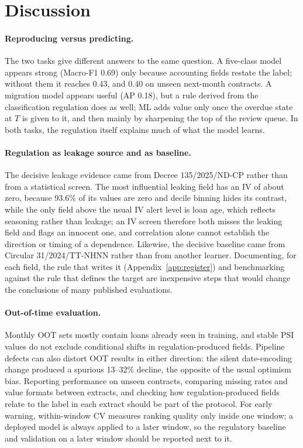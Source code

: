 \documentclass[runningheads]{llncs}
\begin{document}
\section{Discussion}
\label{sec:discussion}

\paragraph{Reproducing versus predicting.} The two tasks give different answers to the same question. A five-class model appears strong (Macro-F1 0.69) only because accounting fields restate the label; without them it reaches 0.43, and 0.40 on unseen next-month contracts. A migration model appears useful (AP 0.18), but a rule derived from the classification regulation does as well; ML adds value only once the overdue state at $T$ is given to it, and then mainly by sharpening the top of the review queue. In both tasks, the regulation itself explains much of what the model learns.

\paragraph{Regulation as leakage source and as baseline.} The decisive leakage evidence came from Decree 135/2025/ND-CP rather than from a statistical screen. The most influential leaking field has an IV of about zero, because 93.6\% of its values are zero and decile binning hides its contrast, while the only field above the usual IV alert level is loan age, which reflects seasoning rather than leakage; an IV screen therefore both misses the leaking field and flags an innocent one, and correlation alone cannot establish the direction or timing of a dependence. Likewise, the decisive baseline came from Circular 31/2024/TT-NHNN rather than from another learner. Documenting, for each field, the rule that writes it (Appendix~\ref{app:register}) and benchmarking against the rule that defines the target are inexpensive steps that would change the conclusions of many published evaluations.

\paragraph{Out-of-time evaluation.} Monthly OOT sets mostly contain loans already seen in training, and stable PSI values do not exclude conditional shifts in regulation-produced fields. Pipeline defects can also distort OOT results in either direction: the silent date-encoding change produced a spurious 13--32\% decline, the opposite of the usual optimism bias. Reporting performance on unseen contracts, comparing missing rates and value formats between extracts, and checking how regulation-produced fields relate to the label in each extract should be part of the protocol. For early warning, within-window CV measures ranking quality only inside one window; a deployed model is always applied to a later window, so the regulatory baseline and validation on a later window should be reported next to it.
\end{document}
